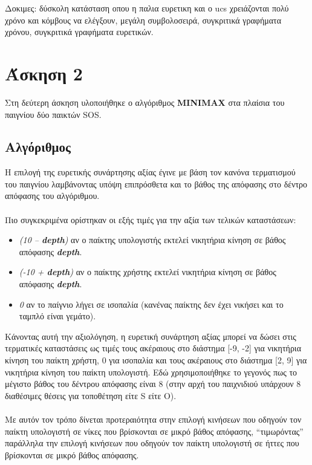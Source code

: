 \documentclass{article}
\begin{document}
        Δοκιμες: δύσκολη κατάσταση οπου η παλια ευρετικη και ο ucs χρειάζονται πολύ χρόνο και κόμβους να ελέγξουν, μεγάλη συμβολοσειρά, συγκριτικά γραφήματα χρόνου, συγκριτικά γραφήματα ευρετικών.
    
    \newpage
    
    \section*{Άσκηση 2}
        Στη δεύτερη άσκηση υλοποιήθηκε ο αλγόριθμος \textbf{MINIMAX} στα πλαίσια του παιγνίου δύο παικτών SOS.

    \subsection*{Αλγόριθμος}
        Η επιλογή της ευρετικής συνάρτησης αξίας έγινε με βάση τον κανόνα τερματισμού του παιγνίου λαμβάνοντας υπόψη επιπρόσθετα και το βάθος της απόφασης στο δέντρο απόφασης του αλγόριθμου.\\\\
        Πιο συγκεκριμένα ορίστηκαν οι εξής τιμές για την αξία των τελικών καταστάσεων:
        \begin{itemize}
            \item \textit{(10 – \textbf{depth})} αν ο παίκτης υπολογιστής εκτελεί νικητήρια κίνηση σε βάθος απόφασης \textit{\textbf{depth}}.
            \item \textit{(-10 + \textbf{depth})} αν ο παίκτης χρήστης εκτελεί νικητήρια κίνηση σε βάθος απόφασης \textit{\textbf{depth}}.
            \item \textit{0} αν το παίγνιο λήγει σε ισοπαλία (κανένας παίκτης δεν έχει νικήσει και το ταμπλό είναι γεμάτο).
        \end{itemize}
        Κάνοντας αυτή την αξιολόγηση, η ευρετική συνάρτηση αξίας μπορεί να δώσει στις τερματικές καταστάσεις ως τιμές τους ακέραιους στο διάστημα
        [-9, -2] για νικητήρια κίνηση του παίκτη χρήστη, 0 για ισοπαλία και τους ακέραιους στο διάστημα [2, 9] για
        νικητήρια κίνηση του παίκτη υπολογιστή. Εδώ χρησιμοποιήθηκε το γεγονός πως το μέγιστο βάθος του δέντρου
        απόφασης είναι 8 (στην αρχή του παιχνιδιού υπάρχουν 8 διαθέσιμες θέσεις
        για τοποθέτηση είτε S είτε O).\\\\
        Με αυτόν τον τρόπο δίνεται προτεραιότητα στην επιλογή κινήσεων που οδηγούν τον παίκτη υπολογιστή σε νίκες που βρίσκονται σε μικρό βάθος απόφασης, “τιμωρόντας” παράλληλα την επιλογή
        κινήσεων που οδηγούν τον παίκτη υπολογιστή σε ήττες που βρίσκονται σε μικρό βάθος απόφασης.
    
\end{document}
